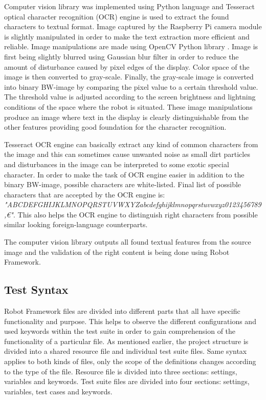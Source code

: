 Computer vision library was implemented using Python language and Tesseract optical character recognition (OCR) engine is used to extract the found characters to textual format. Image captured by the Raspberry Pi camera module is slightly manipulated in order to make the text extraction more efficient and reliable. Image manipulations are made using OpenCV Python library \emph{\citep{opencv}}. Image is first being slightly blurred using Gaussian blur filter in order to reduce the amount of disturbance caused by pixel edges of the display. Color space of the image is then converted to gray-scale. Finally, the gray-scale image is converted into binary BW-image by comparing the pixel value to a certain threshold value. The threshold value is adjusted according to the screen brightness and lightning conditions of the space where the robot is situated. These image manipulations produce an image where text in the display is clearly distinguishable from the other features providing good foundation for the character recognition.

Tesseract OCR engine can basically extract any kind of common characters from the image and this can sometimes cause unwanted noise as small dirt particles and disturbances in the image can be interpreted to some exotic special character. In order to make the task of OCR engine easier in addition to the binary BW-image, possible characters are white-listed. Final list of possible characters that are accepted by the OCR engine is: \emph{"ABCDEFGHIJKLMNOPQRSTUVWXYZabcdefghijklmnopqrstuvwxyz0123456789,\euro"}. This also helps the OCR engine to distinguish right characters from possible similar looking foreign-language counterparts.

The computer vision library outputs all found textual features from the source image and the validation of the right content is being done using Robot Framework. 

\subsection{Test Syntax}
\label{subsection:Test syntax}

Robot Framework files are divided into different parts that all have specific functionality and purpose. This helps to observe the different configurations and used keywords within the test suite in order to gain comprehension of the functionality of a particular file. As mentioned earlier, the project structure is divided into a shared resource file and individual test suite files. Same syntax applies to both kinds of files, only the scope of the definitions changes according to the type of the file. Resource file is divided into three sections: settings, variables and keywords. Test suite files are divided into four sections: settings, variables, test cases and keywords.

